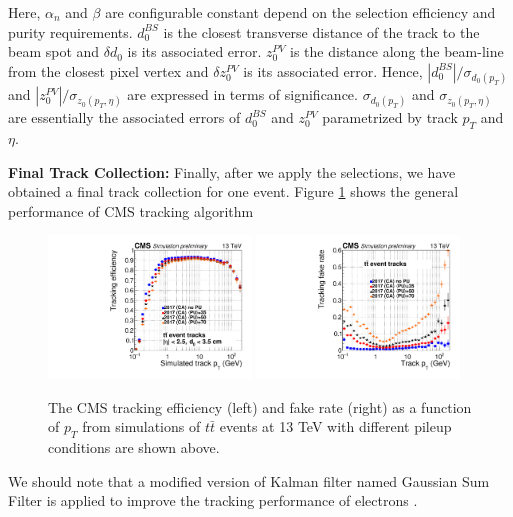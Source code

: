 Here, $\alpha_n$ and $\beta$ are configurable constant depend on the selection efficiency and purity requirements. $d_0^{BS}$ is the closest transverse distance of the track to the beam spot and $\delta d_0$ is its associated error. $z_0^{PV}$ is the distance along the beam-line from the closest pixel vertex and $\delta z_0^{PV}$ is its associated error. Hence, $|d_0^{BS}|/ \sigma_{d_0(p_T)}$ and $|z_0^{PV}|/ \sigma_{z_0(p_T,\eta)}$ are expressed in terms of significance. $\sigma_{d_0(p_T)}$ and $\sigma_{z_0(p_T,\eta)}$ are essentially the associated errors of $d_0^{BS}$ and $z_0^{PV}$ parametrized by track $p_T$ and $\eta$.


\textbf{Final Track Collection:}  Finally, after we apply the selections, we have obtained a final track collection for one event. Figure \ref{CMSTrackPer} shows the general performance of CMS tracking algorithm

\begin{figure}[hbtp]
\begin{center}
\includegraphics[width=0.48\textwidth]{Figures/Chapter2/TrackPTEff.pdf}
\includegraphics[width=0.48\textwidth]{Figures/Chapter2/TrackPTFake.pdf}
\caption{The CMS tracking efficiency (left) and fake rate (right) as a function of $p_T$ from simulations of $t \bar t$ events at 13 TeV with different pileup conditions are shown above.}
\label{CMSTrackPer}
\end{center}
\end{figure} 

We should note that a modified version of Kalman filter named Gaussian Sum Filter \cite{GSF} is applied to improve the tracking performance of electrons \cite{CMSTrackComp}.


